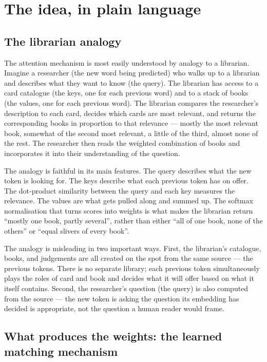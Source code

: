 \section{The idea, in plain language}

\subsection*{The librarian analogy}

The attention mechanism is most easily understood by analogy to
a librarian. Imagine a researcher (the new word being predicted)
who walks up to a librarian and describes what they want to know
(the query). The librarian has access to a card catalogue (the
keys, one for each previous word) and to a stack of books (the
values, one for each previous word). The librarian compares the
researcher's description to each card, decides which cards are
most relevant, and returns the corresponding books in proportion
to that relevance --- mostly the most relevant book, somewhat of
the second most relevant, a little of the third, almost none of
the rest. The researcher then reads the weighted combination of
books and incorporates it into their understanding of the
question.

The analogy is faithful in its main features. The query
describes what the new token is looking for. The keys describe
what each previous token has on offer. The dot-product
similarity between the query and each key measures the relevance.
The values are what gets pulled along and summed up. The
softmax normalisation that turns scores into weights is what
makes the librarian return ``mostly one book, partly several'',
rather than either ``all of one book, none of the others'' or
``equal slivers of every book''.

The analogy is misleading in two important ways. First, the
librarian's catalogue, books, and judgements are all created on
the spot from the same source --- the previous tokens. There is
no separate library; each previous token simultaneously plays
the roles of card and book and decides what it will offer based
on what it itself contains. Second, the researcher's question
(the query) is also computed from the source --- the new token
is asking the question its embedding has decided is appropriate,
not the question a human reader would frame.

\subsection*{What produces the weights: the learned matching mechanism}

